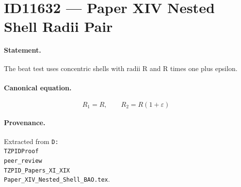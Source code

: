 \section*{ID11632 --- Paper XIV Nested Shell Radii Pair}

\paragraph{Statement.}
The beat test uses concentric shells with radii R and R times one plus epsilon.

\paragraph{Canonical equation.}
\[
R_1=R,\qquad R_2=R(1+\varepsilon)
\]

\paragraph{Provenance.}
Extracted from \texttt{D:\\TZPIDProof\\peer\_review\\TZPID\_Papers\_XI\_XIX\\Paper\_XIV\_Nested\_Shell\_BAO.tex}.
